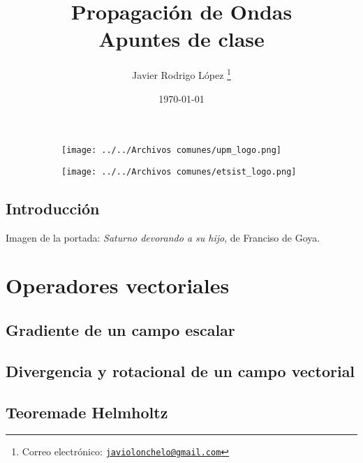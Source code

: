 \documentclass[a4paper]{book}
\title{\Huge Propagación de Ondas\\\vspace*{5pt}
\Large Apuntes de clase}
\author{Javier Rodrigo López \thanks{Correo electrónico: \href{mailto:javiolonchelo@gmail.com}{\texttt{javiolonchelo@gmail.com}}}}
\date{\today}
\begin{document}
\setlength{\wpYoffset}{-2 cm}
\maketitle


\begin{figure}[t!]
	\centering
	\begin{subfigure}[b]{0.65\linewidth}
		\texttt{[image: ../../Archivos comunes/upm\_logo.png]}
	\end{subfigure}
	\begin{subfigure}[b]{0.25\linewidth}
		\texttt{[image: ../../Archivos comunes/etsist\_logo.png]}
	\end{subfigure}
\end{figure}

\newpage
{}
{}
\section*{Introducción}
Imagen de la portada: \textsl{Saturno devorando a su hijo}, de Franciso de Goya.
\newpage

\setlength{\parskip}{0em}
\tableofcontents
\setlength{\parskip}{0.5em}

\chapter{Operadores vectoriales}
\section{Gradiente de un campo escalar}
\section{Divergencia y rotacional de un campo vectorial}
\section{Teoremade Helmholtz}
\end{document}
